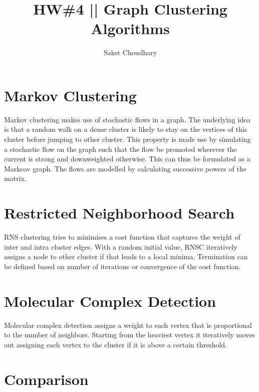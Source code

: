 \documentclass{article}
\begin{document}
	
\title{HW\#4 || Graph Clustering Algorithms}
\author{Saket Choudhary}
\maketitle

\section{Markov Clustering}

Markov clustering makes use of stochastic flows in a graph. The underlying idea is
that a random walk on a dense cluster is likely to stay on the vertices of this cluster before
jumping to other cluster. This property is made use by simulating a stochastic flow on the graph
such that the flow be promoted wherever the current is strong and downweighted otherwise. This can 
thus be formulated as a Markcov graph. The flows are modelled by calculating successive powers of the matrix.

\section{Restricted Neighborhood Search}
RNS clustering tries to minimises a cost function that captures the weight of
inter and intra cluster edges. With a random initial value, RNSC iteratively assigns
a node to other cluster if that leads to a local minima. Termination can be defined based on number of iterations
or convergence of the cost function.

\section{Molecular Complex Detection}
Molecular complex detection assigns a weight to each vertex that is proportional
to the number of neighbors. Starting from the heaviest vertex it iteratively moves out
assigning each vertex to the cluster if it is above a certain threshold.
\section{Comparison}
\end{document}
